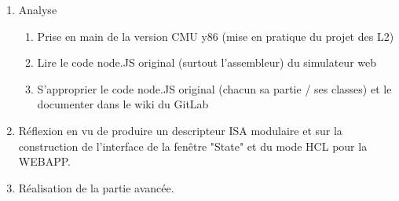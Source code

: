 \documentclass[french]{article}
\begin{document}
\begin{enumerate}
    \item Analyse
    
    \begin{enumerate}
        \item Prise en main de la version CMU y86 (mise en pratique du projet des L2)
        
        \item Lire le code node.JS original (surtout l'assembleur) du simulateur web
        
        \item S'approprier le code node.JS original (chacun sa partie / ses classes) et le documenter dans le wiki du GitLab
    \end{enumerate}
    
    \item Réflexion en vu de produire un descripteur ISA modulaire et sur la construction de l'interface de la fenêtre "State" et du mode HCL pour la WEBAPP.
    
    \item Réalisation de la partie avancée.
\end{enumerate}
\end{document}
